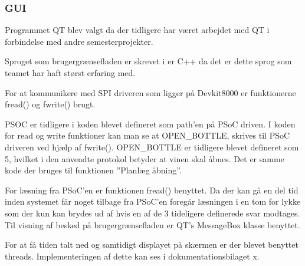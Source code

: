 \subsubsection{GUI}

Programmet QT blev valgt da der tidligere har været arbejdet med QT i forbindelse med andre semesterprojekter. 

Sproget som brugergrænsefladen er skrevet i er C++ da det er dette sprog som teamet har haft størst erfaring med.

For at kommunikere med SPI driveren som ligger på Devkit8000 er funktionerne fread() og fwrite() brugt. 

PSOC er tidligere i koden blevet defineret som path’en på PSoC driven. I koden for read og write funktioner kan man se at OPEN\_BOTTLE, skrives til PSoC driveren ved hjælp af fwrite(). OPEN\_BOTTLE er tidligere blevet defineret som 5, hvilket i den anvendte protokol betyder at vinen skal åbnes. Det er samme kode der bruges til funktionen ”Planlæg åbning”. 

For læsning fra PSoC'en er funktionen fread() benyttet. Da der kan gå en del tid inden systemet får noget tilbage fra PSoC'en foregår læsningen i en tom for lykke som der kun kan brydes ud af hvis en af de 3 tideligere definerede svar modtages. Til visning af besked på brugergrænsefladen er QT's MessageBox klasse benyttet. 

For at få tiden talt ned og samtidigt displayet på skærmen er der blevet benyttet threads. Implementeringen af dette kan ses i dokumentationsbilaget x.
